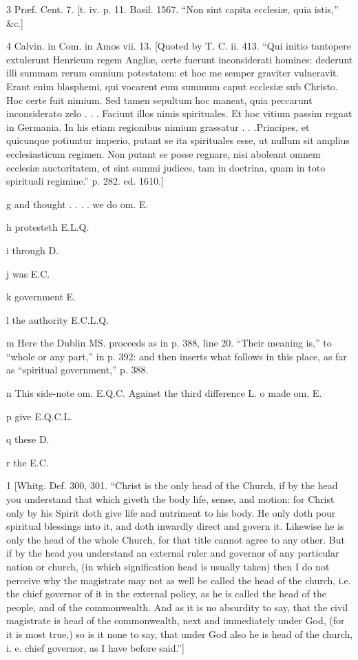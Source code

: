 3
Præf. Cent. 7. [t. iv. p. 11. Basil. 1567. “Non sint capita ecclesiæ, quia istis,” &c.]

4
Calvin. in Com. in Amos vii. 13. [Quoted by T. C. ii. 413. “Qui initio tantopere extulerunt Henricum regem Angliæ, certe fuerunt inconsiderati homines: dederunt illi summam rerum omnium potestatem: et hoc me semper graviter vulneravit. Erant enim blasphemi, qui vocarent eum summum caput ecclesiæ sub Christo. Hoc certe fuit nimium. Sed tamen sepultum hoc maneat, quia peccarunt inconsiderato zelo . . . Faciunt illos nimis spirituales. Et hoc vitium passim regnat in Germania. In his etiam regionibus nimium grassatur . . .Principes, et quicunque potiuntur imperio, putant se ita spirituales esse, ut nullum sit amplius ecclesiasticum regimen. Non putant se posse regnare, nisi aboleant omnem ecclesiæ auctoritatem, et sint summi judices, tam in doctrina, quam in toto spirituali regimine.” p. 282. ed. 1610.]

g
and thought . . . . we do om. E.

h
protesteth E.L.Q.

i
through D.

j
was E.C.

k
government E.

l
the authority E.C.L.Q.

m
Here the Dublin MS. proceeds as in p. 388, line 20. “Their meaning is,” to “whole or any part,” in p. 392: and then inserts what follows in this place, as far as “spiritual government,” p. 388.

n This side-note om. E.Q.C. Against the third difference L.
o
made om. E.

p
give E.Q.C.L.

q
these D.

r
the E.C.

1
[Whitg. Def. 300, 301. “Christ is the only head of the Church, if by the head you understand that which giveth the body life, sense, and motion: for Christ only by his Spirit doth give life and nutriment to his body. He only doth pour spiritual blessings into it, and doth inwardly direct and govern it. Likewise he is only the head of the whole Church, for that title cannot agree to any other. But if by the head you understand an external ruler and governor of any particular nation or church, (in which signification head is usually taken) then I do not perceive why the magistrate may not as well be called the head of the church, i.e. the chief governor of it in the external policy, as he is called the head of the people, and of the commonwealth. And as it is no absurdity to say, that the civil magistrate is head of the commonwealth, next and immediately under God, (for it is most true,) so is it none to say, that under God also he is head of the church, i. e. chief governor, as I have before said.”]

